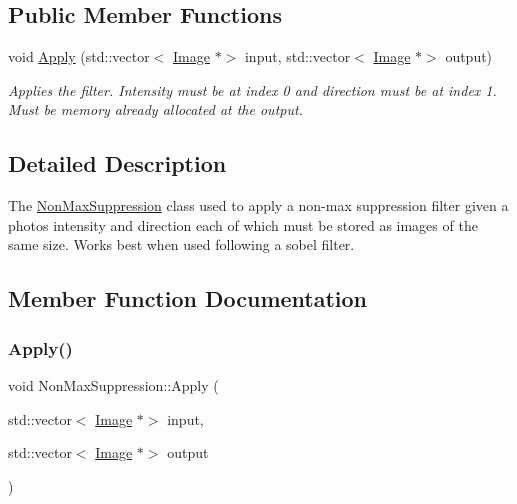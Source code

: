 \subsection*{Public Member Functions}
\begin{DoxyCompactItemize}
\item 
void \hyperlink{classNonMaxSuppression_a430a98e5683f8f70e7d8aaaa6efee5e8}{Apply} (std\+::vector$<$ \hyperlink{classImage}{Image} $\ast$$>$ input, std\+::vector$<$ \hyperlink{classImage}{Image} $\ast$$>$ output)
\begin{DoxyCompactList}\small\item\em Applies the filter. Intensity must be at index 0 and direction must be at index 1. Must be memory already allocated at the output. \end{DoxyCompactList}\end{DoxyCompactItemize}


\subsection{Detailed Description}
The \hyperlink{classNonMaxSuppression}{Non\+Max\+Suppression} class used to apply a non-\/max suppression filter given a photo\textquotesingle{}s intensity and direction each of which must be stored as images of the same size. Works best when used following a sobel filter. 

\subsection{Member Function Documentation}
\mbox{\label{classNonMaxSuppression_a430a98e5683f8f70e7d8aaaa6efee5e8}} 
\subsubsection{\texorpdfstring{Apply()}{Apply()}}
{\footnotesize\ttfamily void Non\+Max\+Suppression\+::\+Apply (\begin{DoxyParamCaption}\item[{std\+::vector$<$ \hyperlink{classImage}{Image} $\ast$$>$}]{input,  }\item[{std\+::vector$<$ \hyperlink{classImage}{Image} $\ast$$>$}]{output }\end{DoxyParamCaption})\hspace{0.3cm}{\ttfamily [virtual]}}



